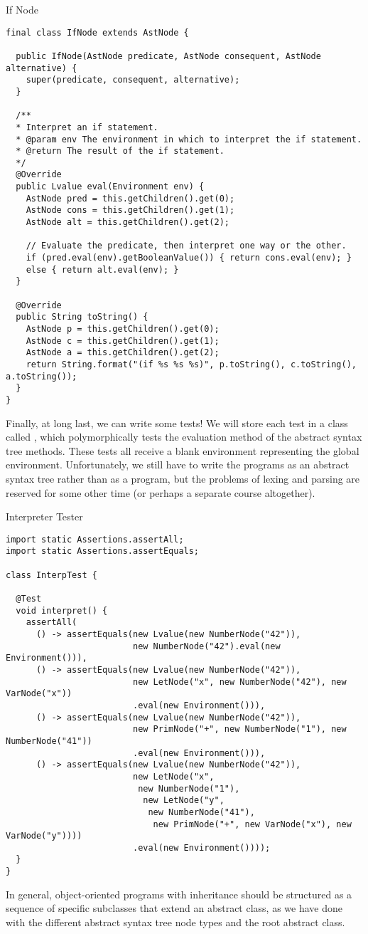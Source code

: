 \begin{cl}[]{If Node}
\begin{lstlisting}[language=MyJava]
final class IfNode extends AstNode {
  
  public IfNode(AstNode predicate, AstNode consequent, AstNode alternative) {
    super(predicate, consequent, alternative);
  }

  /**
  * Interpret an if statement.
  * @param env The environment in which to interpret the if statement.
  * @return The result of the if statement.
  */
  @Override
  public Lvalue eval(Environment env) {
    AstNode pred = this.getChildren().get(0);
    AstNode cons = this.getChildren().get(1);
    AstNode alt = this.getChildren().get(2);

    // Evaluate the predicate, then interpret one way or the other.
    if (pred.eval(env).getBooleanValue()) { return cons.eval(env); } 
    else { return alt.eval(env); }
  }
  
  @Override
  public String toString() {
    AstNode p = this.getChildren().get(0);
    AstNode c = this.getChildren().get(1);
    AstNode a = this.getChildren().get(2);
    return String.format("(if %s %s %s)", p.toString(), c.toString(), a.toString());
  }
}
\end{lstlisting}
\end{cl}

Finally, at long last, we can write some tests! We will store each test in a class called , which polymorphically tests the evaluation method of the abstract syntax tree methods. These tests all receive a blank environment representing the global environment. Unfortunately, we still have to write the programs as an abstract syntax tree rather than as a program, but the problems of lexing and parsing are reserved for some other time (or perhaps a separate course altogether).

\begin{cl}[]{Interpreter Tester}
\begin{lstlisting}[language=MyJava]
import static Assertions.assertAll;
import static Assertions.assertEquals;
  
class InterpTest {
  
  @Test
  void interpret() {
    assertAll(
      () -> assertEquals(new Lvalue(new NumberNode("42")),
                         new NumberNode("42").eval(new Environment())),
      () -> assertEquals(new Lvalue(new NumberNode("42")),
                         new LetNode("x", new NumberNode("42"), new VarNode("x"))
                         .eval(new Environment())),
      () -> assertEquals(new Lvalue(new NumberNode("42")),
                         new PrimNode("+", new NumberNode("1"), new NumberNode("41"))
                         .eval(new Environment())),
      () -> assertEquals(new Lvalue(new NumberNode("42")),
                         new LetNode("x",
                          new NumberNode("1"),
                           new LetNode("y",
                            new NumberNode("41"),
                             new PrimNode("+", new VarNode("x"), new VarNode("y"))))
                         .eval(new Environment())));
  }
}
\end{lstlisting}
\end{cl}

In general, object-oriented programs with inheritance should be structured as a sequence of specific subclasses that extend an abstract class, as we have done with the different abstract syntax tree node types and the root  abstract class. 

